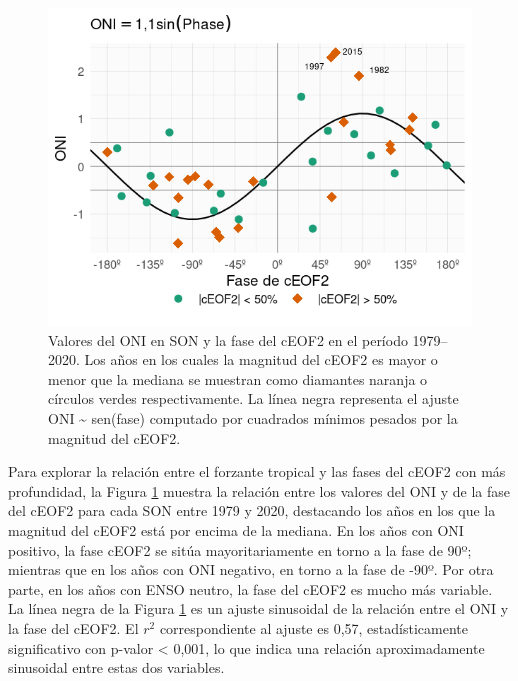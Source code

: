 \documentclass[12pt,oneside,a4paper]{reedthesis}
\begin{document}
\begin{figure}

{\centering \includegraphics{figures/20-ceofs/enso-phase-1} 

}

\caption{Valores del ONI en SON y la fase del cEOF2 en el período 1979--2020. Los años en los cuales la magnitud del cEOF2 es mayor o menor que la mediana se muestran como diamantes naranja o círculos verdes respectivamente. La línea negra representa el ajuste ONI \textasciitilde{} sen(fase) computado por cuadrados mínimos pesados por la magnitud del cEOF2.}\label{fig:enso-phase}
\end{figure}

Para explorar la relación entre el forzante tropical y las fases del cEOF2 con más profundidad, la Figura \ref{fig:enso-phase} muestra la relación entre los valores del ONI y de la fase del cEOF2 para cada SON entre 1979 y 2020, destacando los años en los que la magnitud del cEOF2 está por encima de la mediana.
En los años con ONI positivo, la fase cEOF2 se sitúa mayoritariamente en torno a la fase de 90º; mientras que en los años con ONI negativo, en torno a la fase de -90º.
Por otra parte, en los años con ENSO neutro, la fase del cEOF2 es mucho más variable.
La línea negra de la Figura \ref{fig:enso-phase} es un ajuste sinusoidal de la relación entre el ONI y la fase del cEOF2.
El \(r^2\) correspondiente al ajuste es 0,57, estadísticamente significativo con p-valor \textless{} 0,001, lo que indica una relación aproximadamente sinusoidal entre estas dos variables.
\end{document}
